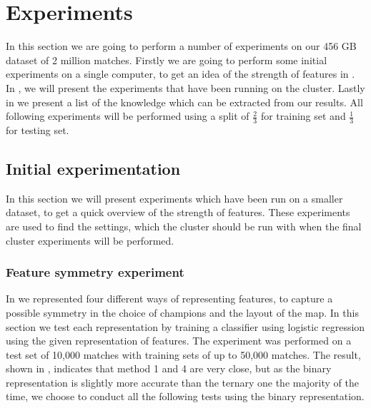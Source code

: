 \section{Experiments}\label{sec:testing}
In this section we are going to perform a number of experiments on our 456 GB dataset of 2 million matches. Firstly we are going to perform some initial experiments on a single computer, to get an idea of the strength of features in . In , we will present the experiments that have been running on the cluster. Lastly in  we present a list of the knowledge which can be extracted from our results. All following experiments will be performed using a split of $\frac{2}{3}$ for training set and $\frac{1}{3}$ for testing set. 

\subsection{Initial experimentation}\label{sec:initialtest}
In this section we will present experiments which have been run on a smaller dataset, to get a quick overview of the strength of features. These experiments are used to find the settings, which the cluster should be run with when the final cluster experiments will be performed. 


\subsubsection{Feature symmetry experiment}
In  we represented four different ways of representing features, to capture a possible symmetry in the choice of champions and the layout of the map. In this section we test each representation by training a classifier using logistic regression using the given representation of features. The experiment was performed on a test set of 10,000 matches with training sets of up to 50,000 matches. The result, shown in , indicates that method 1 and 4 are very close, but as the binary representation is slightly more accurate than the ternary one the majority of the time, we choose to conduct all the following tests using the binary representation. 

